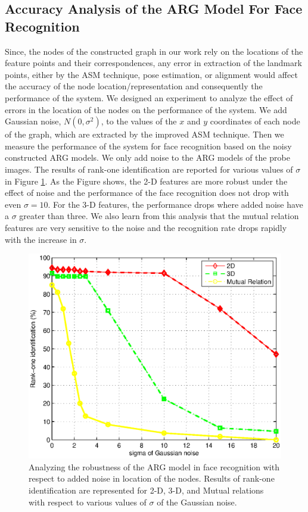 {\subsection{Accuracy Analysis of the ARG Model For Face Recognition}
\label{accuracy_ARG} Since, the nodes of the constructed graph in
our work rely on the locations of the feature points and their
correspondences, any error in extraction of the landmark points,
either by the ASM technique, pose estimation, or alignment would
affect the accuracy of the node location/representation and
consequently the performance of the system. We designed an
experiment to analyze the effect of errors in the location of the
nodes on the performance of the system. We add Gaussian noise,
$N(0,\sigma^2)$, to the values of the $x$ and $y$ coordinates of
each node of the graph, which are extracted by the improved ASM
technique. Then we measure the performance of the system for face
recognition based on the noisy constructed ARG models. We only add
noise to the ARG models of the probe images. The results of rank-one
identification are reported for various values of $\sigma$ in Figure
\ref{fig_accuracy_ARG}. As the Figure shows, the 2-D features are
more robust under the effect of noise and the performance of the
face recognition does not drop with even $\sigma = 10$. For the 3-D
features, the performance drops where added noise have a $\sigma$
greater than three. We also learn from this analysis that the mutual
relation features are very sensitive to the noise and the
recognition rate drops rapidly with the increase in $\sigma$.

\begin{figure}[tbp]
\begin{center}
\includegraphics[scale = .6]{./chapters/figures/ARG_noise_analysis.eps}
\caption{Analyzing the robustness of the ARG model in face
recognition with respect to added noise in location of the nodes.
Results of rank-one identification are represented for 2-D, 3-D, and
Mutual relations with respect to various values of $\sigma$ of the
Gaussian noise.}\label{fig_accuracy_ARG}
\end{center}
\end{figure}

}
